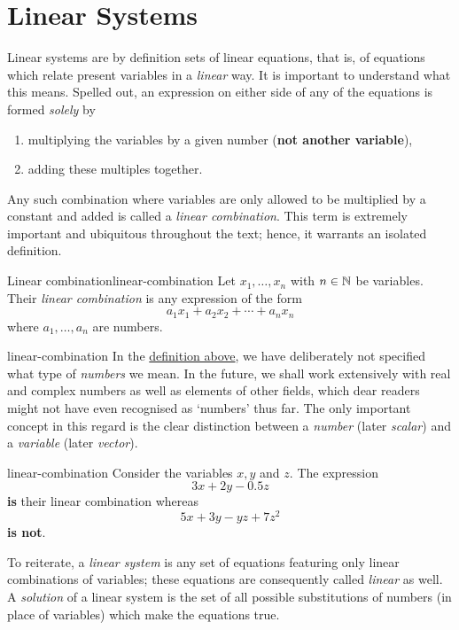 \chapter{Linear Systems}
\label{chap:linear-systems}

Linear systems are by definition sets of linear equations, that is, of equations
which relate present variables in a \emph{linear} way. It is important to
understand what this means. Spelled out, an expression on either side of any of
the equations is formed \emph{solely} by
\begin{enumerate}
 \item multiplying the variables by a given number (\textbf{not another
  variable}),
 \item adding these multiples together.
\end{enumerate}
Any such combination where variables are only allowed to be multiplied by a
constant and added is called a \emph{linear combination}. This term is extremely
important and ubiquitous throughout the text; hence, it warrants an isolated
definition. 

\begin{definition}{Linear combination}{linear-combination}
 Let $x_1,\ldots,x_n$ with $n \in \mathbb{N}$ be variables. Their \emph{linear
 combination} is any expression of the form
 \[
  a_1x_1 + a_2x_2 + \cdots + a_n x_n
 \]
 where $a_1,\ldots,a_n$ are numbers.
\end{definition}

\begin{remark}{}{linear-combination}
 In the \hyperref[def:linear-combination]{definition above}, we have
 deliberately not specified what type of \emph{numbers} we mean. In the future,
 we shall work extensively with real and complex numbers as well as elements of
 other fields, which dear readers might not have even recognised as `numbers'
 thus far. The only important concept in this regard is the clear distinction
 between a \emph{number} (later \emph{scalar}) and a \emph{variable} (later
 \emph{vector}).
\end{remark}

\begin{example}{}{linear-combination}
 Consider the variables $x,y$ and $z$. The expression
 \[
  3x + 2y - 0.5z
 \]
 \textbf{is} their linear combination whereas
 \[
  5x + 3y - yz + 7z^2
 \]
 \textbf{is not}.
\end{example}

To reiterate, a \emph{linear system} is any set of equations featuring only
linear combinations of variables; these equations are consequently called
\emph{linear} as well. A \emph{solution} of a linear system is the set of all
possible substitutions of numbers (in place of variables) which make the
equations true.


